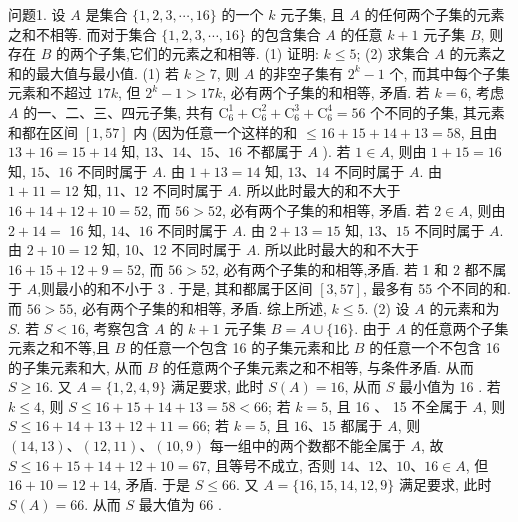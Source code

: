 
问题1. 设 $A$ 是集合 $\{1,2,3, \cdots, 16\}$ 的一个 $k$ 元子集, 且 $A$ 的任何两个子集的元素之和不相等.
而对于集合 $\{1,2,3, \cdots, 16\}$ 的包含集合 $A$ 的任意 $k+1$ 元子集 $B$, 则存在 $B$ 的两个子集,它们的元素之和相等.
(1) 证明: $k \leqslant 5$; (2) 求集合 $A$ 的元素之和的最大值与最小值.
(1) 若 $k \geqslant 7$, 则 $A$ 的非空子集有 $2^k-1$ 个, 而其中每个子集元素和不超过 $17 k$, 但 $2^k-1>17 k$, 必有两个子集的和相等, 矛盾.
若 $k=6$, 考虑 $A$ 的一、二、三、四元子集, 共有 $\mathrm{C}_6^1+\mathrm{C}_6^2+\mathrm{C}_6^3+\mathrm{C}_6^4=56$ 个不同的子集, 其元素和都在区间 $[1,57]$ 内 (因为任意一个这样的和 $\leqslant 16+15+14+13=58$, 且由 $13+16=15+14$ 知, $13 、 14 、 15 、 16$ 不都属于 $A$ ). 若 $1 \in A$, 则由 $1+15=16$ 知, $15 、 16$ 不同时属于 $A$. 由 $1+13=14$ 知, $13 、 14$ 不同时属于 $A$. 由 $1+ 11=12$ 知, $11 、 12$ 不同时属于 $A$. 所以此时最大的和不大于 $16+14+12+ 10=52$, 而 $56>52$, 必有两个子集的和相等, 矛盾.
若 $2 \in A$, 则由 $2+14=$ 16 知, $14 、 16$ 不同时属于 $A$. 由 $2+13=15$ 知, $13 、 15$ 不同时属于 $A$. 由 $2+ 10=12$ 知, 10、12 不同时属于 $A$. 所以此时最大的和不大于 $16+15+12+ 9=52$, 而 $56>52$, 必有两个子集的和相等,矛盾.
若 1 和 2 都不属于 $A$,则最小的和不小于 3 . 于是, 其和都属于区间 $[3,57]$, 最多有 55 个不同的和.
而 $56>55$, 必有两个子集的和相等, 矛盾.
综上所述, $k \leqslant 5$. (2) 设 $A$ 的元素和为 $S$. 若 $S<16$, 考察包含 $A$ 的 $k+1$ 元子集 $B=A \cup\{16\}$. 由于 $A$ 的任意两个子集元素之和不等,且 $B$ 的任意一个包含 16 的子集元素和比 $B$ 的任意一个不包含 16 的子集元素和大, 从而 $B$ 的任意两个子集元素之和不相等, 与条件矛盾.
从而 $S \geqslant 16$. 又 $A=\{1,2,4,9\}$ 满足要求, 此时 $S(A)=16$, 从而 $S$ 最小值为 16 . 若 $k \leqslant 4$, 则 $S \leqslant 16+15+14+13=58<66$; 若 $k=5$, 且 16 、 15 不全属于 $A$, 则 $S \leqslant 16+14+13+12+11=66$; 若 $k=5$, 且 $16 、 15$ 都属于 $A$, 则 $(14,13) 、(12,11) 、(10,9)$ 每一组中的两个数都不能全属于 $A$, 故 $S \leqslant 16+15+14+12+10=67$, 且等号不成立, 否则 $14 、 12 、 10 、 16 \in A$, 但 $16+10=12+14$, 矛盾.
于是 $S \leqslant 66$. 又 $A=\{16,15,14,12,9\}$ 满足要求, 此时 $S(A)=66$. 从而 $S$ 最大值为 66 .



